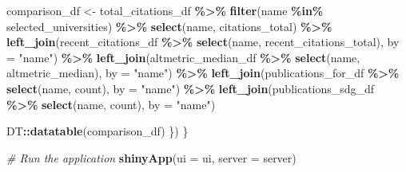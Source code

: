 \documentclass[
]{article}
\newenvironment{Shaded}{\begin{snugshade}}{\end{snugshade}}
\newcommand{\AttributeTok}[1]{\textcolor[rgb]{0.13,0.29,0.53}{#1}}
\newcommand{\CommentTok}[1]{\textcolor[rgb]{0.56,0.35,0.01}{\textit{#1}}}
\newcommand{\FunctionTok}[1]{\textcolor[rgb]{0.13,0.29,0.53}{\textbf{#1}}}
\newcommand{\NormalTok}[1]{#1}
\newcommand{\OtherTok}[1]{\textcolor[rgb]{0.56,0.35,0.01}{#1}}
\newcommand{\SpecialCharTok}[1]{\textcolor[rgb]{0.81,0.36,0.00}{\textbf{#1}}}
\newcommand{\StringTok}[1]{\textcolor[rgb]{0.31,0.60,0.02}{#1}}
\begin{document}
\begin{Shaded}
\begin{Highlighting}[]
\NormalTok{    comparison\_df }\OtherTok{\textless{}{-}}\NormalTok{ total\_citations\_df }\SpecialCharTok{\%\textgreater{}\%} 
      \FunctionTok{filter}\NormalTok{(name }\SpecialCharTok{\%in\%}\NormalTok{ selected\_universities) }\SpecialCharTok{\%\textgreater{}\%} 
      \FunctionTok{select}\NormalTok{(name, citations\_total) }\SpecialCharTok{\%\textgreater{}\%} 
      \FunctionTok{left\_join}\NormalTok{(recent\_citations\_df }\SpecialCharTok{\%\textgreater{}\%} \FunctionTok{select}\NormalTok{(name, recent\_citations\_total), }\AttributeTok{by =} \StringTok{"name"}\NormalTok{) }\SpecialCharTok{\%\textgreater{}\%} 
      \FunctionTok{left\_join}\NormalTok{(altmetric\_median\_df }\SpecialCharTok{\%\textgreater{}\%} \FunctionTok{select}\NormalTok{(name, altmetric\_median), }\AttributeTok{by =} \StringTok{"name"}\NormalTok{) }\SpecialCharTok{\%\textgreater{}\%} 
      \FunctionTok{left\_join}\NormalTok{(publications\_for\_df }\SpecialCharTok{\%\textgreater{}\%} \FunctionTok{select}\NormalTok{(name, count), }\AttributeTok{by =} \StringTok{"name"}\NormalTok{) }\SpecialCharTok{\%\textgreater{}\%} 
      \FunctionTok{left\_join}\NormalTok{(publications\_sdg\_df }\SpecialCharTok{\%\textgreater{}\%} \FunctionTok{select}\NormalTok{(name, count), }\AttributeTok{by =} \StringTok{"name"}\NormalTok{)}
    
\NormalTok{    DT}\SpecialCharTok{::}\FunctionTok{datatable}\NormalTok{(comparison\_df)}
\NormalTok{  \})}
\NormalTok{\}}

\CommentTok{\# Run the application }
\FunctionTok{shinyApp}\NormalTok{(}\AttributeTok{ui =}\NormalTok{ ui, }\AttributeTok{server =}\NormalTok{ server)}
\end{Highlighting}
\end{Shaded}
\end{document}

